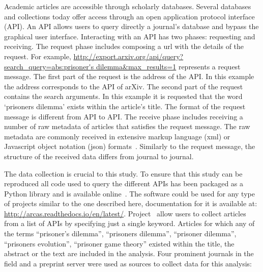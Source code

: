 \documentclass{article}
\theoremstyle{definition}
\begin{document}
Academic articles are accessible through scholarly databases. Several databases
and collections today offer access through an open application protocol
interface (API). An API allows users to query directly a journal's database and
bypass the graphical user interface. Interacting with an API has two phases:
requesting and receiving. The request phase includes composing a url with the
details of the request. For example,
\url{http://export.arxiv.org/api/query?search_query=abs:prisoner's
dilemma&max_results=1} represents a request message. The first part of the
request is the address of the API. In this example the address corresponds to
the API of arXiv. The second part of the request contains the search arguments.
In this example it is requested that the word `prisoners dilemma' exists within
the article's title. The format of the request message is different from API to
API. The receive phase includes receiving a number of raw metadata of articles
that satisfies the request message. The raw metadata are commonly received in
extensive markup language (xml) or Javascript object notation (json)
formats~\cite{nurseitov2009}. Similarly to the request message, the structure of
the received data differs from journal
to journal.

The data collection is crucial to this study. To ensure that this study can be
reproduced all code used to query the different APIs has been packaged as a
Python library and is available online~\cite{nikoleta_2017}. The software could
be used for any type of projects similar to the one described here,
documentation for it is available at:
\url{http://arcas.readthedocs.io/en/latest/}. Project~\cite{nikoleta_2017} allow
users to collect articles from a list of APIs by specifying just a single
keyword. Articles for which any of the terms ``prisoner's dilemma'',
``prisoners dilemma'', ``prisoner dilemma'', ``prisoners evolution'', ``prisoner
game theory'' existed within the title, the abstract or the text are included
in the analysis. Four prominent journals in the field and a preprint server
were used as sources to collect data for this analysis:
\end{document}
